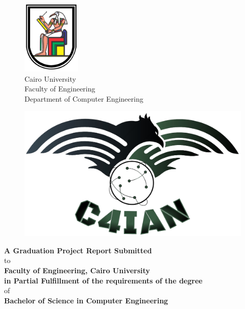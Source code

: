 \pagecolor{gpCoverBGColor}\afterpage{\nopagecolor}
\thispagestyle{empty}
{\color{gpCoverTextColor}
\begin{figure}
\includegraphics[width=1.09in]{images/cu-logo.png}\\
{\color{gpCoverTextColor} 
Cairo University\\
Faculty of Engineering\\
Department of Computer Engineering
}
\vspace{30pt}
\end{figure}

\begin{center}
    \vspace{10pt}
    {\fontsize{32}{50} \selectfont \textbf{\gpProject{}}}
    \vspace{15pt}
    
    \begin{figure}[H]
    \centering
    \includegraphics[width=0.5\linewidth]{images/logo.png}
    \label{fig:log-vis}
    \end{figure}

    \vspace{10pt}
    \textbf{A Graduation Project Report Submitted}
    \vspace{3pt}\\
    to
    \vspace{3pt}\\
    \textbf{Faculty of Engineering, Cairo University} 
    \vspace{3pt}\\
    \textbf{in Partial Fulfillment of the requirements of the degree}
    \vspace{3pt}\\
    of
    \vspace{3pt}\\
    \textbf{Bachelor of Science in Computer Engineering}
    \vspace{10pt}
    

\end{center}}
